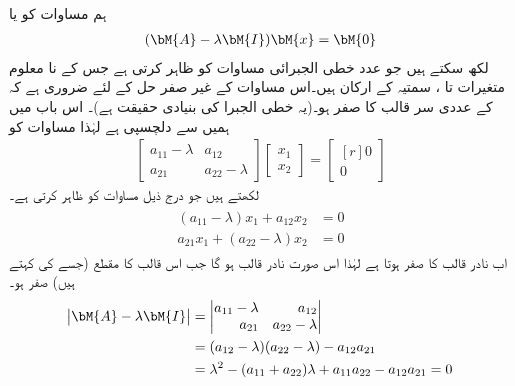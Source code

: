 ہم مساوات  کو  یا 
\begin{align}\label{مساوات_نظام_آئگنی_ب}
(\bM{A}-\lambda \bM{I})\bM{x}=\bM{0}
\end{align}
لکھ سکتے ہیں جو  عدد خطی الجبرائی مساوات کو ظاہر کرتی ہے جس کے نا معلوم متغیرات  تا ، سمتیہ  کے ارکان ہیں۔اس مساوات کے غیر صفر حل  کے لئے ضروری ہے کہ  کے عددی سر قالب کا  صفر ہو۔(یہ خطی الجبرا کی بنیادی حقیقت ہے)۔ اس باب میں ہمیں   سے دلچسپی ہے لہٰذا مساوات  کو
\begin{align}\label{مساوات_نظام_آئگنی_پ}
\begin{bmatrix*}
a_{11}-\lambda& a_{12}\\
a_{21}& a_{22}-\lambda
\end{bmatrix*}
\begin{bmatrix*}
x_1\\
x_2
\end{bmatrix*}=
\begin{bmatrix*}[r]
0\\
0
\end{bmatrix*}
\end{align}
لکھتے ہیں جو درج ذیل مساوات کو ظاہر کرتی ہے۔
\begin{gather}\label{مساوات_نظام_آئگنی_ت}
\begin{aligned}
(a_{11}-\lambda)x_1+a_{12}x_2&=0\\
a_{21}x_1+(a_{22}-\lambda)x_2&=0
\end{aligned}
\end{gather}
اب نادر قالب کا  صفر ہوتا ہے لہٰذا   اس صورت نادر قالب ہو گا جب اس قالب کا مقطع (جسے  کی  کہتے ہیں) صفر ہو۔
\begin{gather}\label{مساوات_نظام_آئگنی_ٹ}
\begin{aligned}
\abs{\bM{A}-\lambda \bM{I}}&=
\begin{vmatrix*}[r]
a_{11}-\lambda& a_{12}\\
a_{21}& a_{22}-\lambda
\end{vmatrix*}\\
&=(a_{12}-\lambda)(a_{22}-\lambda)-a_{12}a_{21}\\
&=\lambda^2-(a_{11}+a_{22})\lambda+a_{11}a_{22}-a_{12}a_{21}=0
\end{aligned}
\end{gather}
